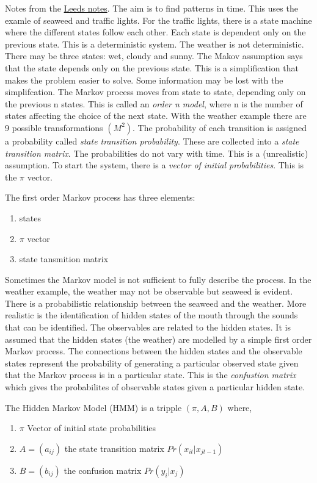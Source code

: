 \documentclass[12pt, a4paper, oneside]{article} %
\begin{document}
Notes from the \href{http://www.comp.leeds.ac.uk/roger/HiddenMarkovModels/html_dev/main.html}{Leeds notes}.  The aim is to find patterns in time. This uses the examle of seaweed and traffic lights.  For the traffic lights, there is a state machine where the different states follow each other. Each state is dependent only on the previous state. This is a deterministic system. The weather is not deterministic.  There may be three states:  wet, cloudy and sunny. The Makov assumption says that the state depends only on the previous state. This is a simplification that makes the problem easier to solve.  Some information may be lost with the simplifcation. The Markov process moves from state to state, depending only on the previous n states.  This is called an \emph{order n model}, where n is the number of states affecting the choice of the next state. With the weather example there are 9 possible transformations $(M^2)$.  The probability of each transition is assigned  a probability called \emph{state transition probability}.  These are collected into a \emph{state transition matrix}. The probabilities do not vary with time.  This is a (unrealistic) assumption. To start the system, there is a \emph{vector of initial probabilities}.  This is the $\pi$ vector.  

The first order Markov process has three elements: 
\begin{enumerate}
\item states
\item $\pi$ vector
\item state tansmition matrix
\end{enumerate}
 Sometimes the Markov model is not sufficient to fully describe the process.  In the weather example, the weather may not be observable but seaweed is evident.  There is a probabilistic relationship between the seaweed and the weather.  More realistic is the identification of hidden states of the mouth through the sounds that can be identified.  The observables are related to the hidden states. It is assumed that the hidden states (the weather) are modelled by a simple first order Markov process.  The connections between the hidden states and the observable states represent the probability of generating a particular observed state given that the Markov process is in a particular state.  This is the \emph{confustion matrix} which gives the probabilites of observable states given a particular hidden state. 
 
The Hidden Markov Model (HMM) is a tripple $(\pi, A, B)$ where, 
\begin{enumerate}
\item $\pi$ Vector of initial state probabilities
\item $A = (a_{ij})$ the state transition matrix $Pr(x_{it}|x_{jt-1})$
\item $B = (b_{ij})$ the confusion matrix $Pr(y_i|x_j)$
\end{enumerate}
\end{document}
